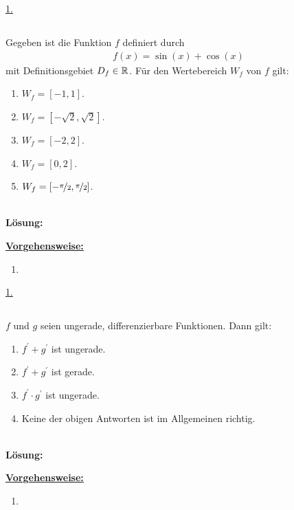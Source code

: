 \underline{1. }\\

\newpage
\subsection*{}
Gegeben ist die Funktion $ f $ definiert durch
\begin{align*}
	f(x) = \sin(x) + \cos(x)
\end{align*}
mit Definitionsgebiet $ D_f \in \mathbb{R} $. Für den Wertebereich $ W_f $ von $ f $ gilt:
\renewcommand{\labelenumi}{(\alph{enumi})}
\begin{enumerate}
	\item 
	$ W_f = [-1,1] $.
	\item
	$ W_f = [-\sqrt{2},\sqrt{2}] $.
	\item
	$ W_f = [-2,2] $.
	\item
	$ W_f = [0,2] $.
	\item
	$ W_f = [-\nicefrac{\pi }{2}, \nicefrac{\pi }{2}] $.
\end{enumerate}
\ \\
\textbf{Lösung:}
\begin{mdframed}
\underline{\textbf{Vorgehensweise:}}
\renewcommand{\labelenumi}{\theenumi.}
\begin{enumerate}
\item 
\end{enumerate}
\end{mdframed}

\underline{1. }\\

\newpage

\subsection*{}
$ f $ und $ g $ seien ungerade, differenzierbare Funktionen. Dann gilt:
\renewcommand{\labelenumi}{(\alph{enumi})}
\begin{enumerate}
	\item 
	$ f^\prime + g^\prime $ ist ungerade.
	\item
	$ f^\prime + g^\prime $ ist gerade.
	\item
	$ f^\prime \cdot g^\prime $ ist ungerade.
	\item
	Keine der obigen Antworten ist im Allgemeinen richtig.
\end{enumerate}
\ \\
\textbf{Lösung:}
\begin{mdframed}
\underline{\textbf{Vorgehensweise:}}
\renewcommand{\labelenumi}{\theenumi.}
\begin{enumerate}
\item 
\end{enumerate}
\end{mdframed}

